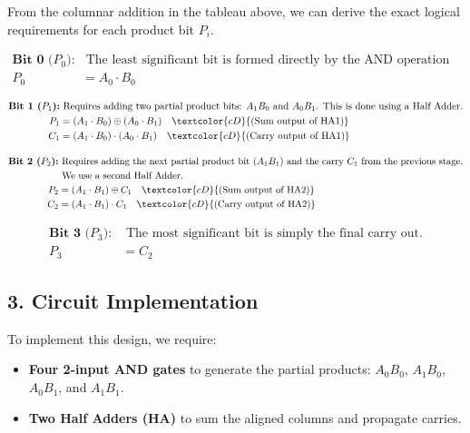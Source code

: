 \documentclass[12pt,a3paper]{article}
\begin{document}
\begin{enumerate}
\begin{tcolorbox}[enhanced,breakable,ansbox,colback=cD!4,colframe=cD,boxrule=0.8pt,arc=5pt,title={\textbf{Answer}},fonttitle=\bfseries\color{white},colbacktitle=cD]
From the columnar addition in the tableau above, we can derive the exact logical requirements for each product bit $P_i$.

\begin{align*}
    \textbf{Bit 0 ($P_0$):} & \text{ The least significant bit is formed directly by the AND operation of the LSBs.} \\
    P_0 &= A_0 \cdot B_0
\end{align*}

\begin{align*}
    \textbf{Bit 1 ($P_1$):} & \text{ Requires adding two partial product bits: $A_1 B_0$ and $A_0 B_1$. This is done using a Half Adder.} \\
    P_1 &= (A_1 \cdot B_0) \oplus (A_0 \cdot B_1) \quad \textcolor{cD}{\text{(Sum output of HA1)}} \\
    C_1 &= (A_1 \cdot B_0) \cdot (A_0 \cdot B_1) \quad \textcolor{cD}{\text{(Carry output of HA1)}}
\end{align*}

\begin{align*}
    \textbf{Bit 2 ($P_2$):} & \text{ Requires adding the next partial product bit ($A_1 B_1$) and the carry $C_1$ from the previous stage.} \\
    & \text{ We use a second Half Adder.} \\
    P_2 &= (A_1 \cdot B_1) \oplus C_1 \quad \textcolor{cD}{\text{(Sum output of HA2)}} \\
    C_2 &= (A_1 \cdot B_1) \cdot C_1 \quad \textcolor{cD}{\text{(Carry output of HA2)}}
\end{align*}

\begin{align*}
    \textbf{Bit 3 ($P_3$):} & \text{ The most significant bit is simply the final carry out.} \\
    P_3 &= C_2
\end{align*}

\subsection*{3. Circuit Implementation}

To implement this design, we require:
\begin{itemize}
    \item \textbf{Four 2-input AND gates} to generate the partial products: $A_0 B_0$, $A_1 B_0$, $A_0 B_1$, and $A_1 B_1$.
    \item \textbf{Two Half Adders (HA)} to sum the aligned columns and propagate carries.
\end{itemize}


\end{tcolorbox}
\end{enumerate}
\end{document}
